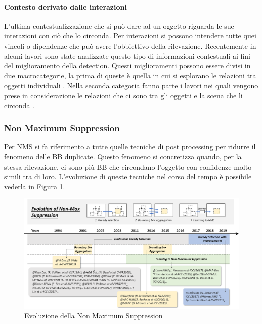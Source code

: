 \paragraph{Contesto derivato dalle interazioni}
L'ultima contestualizzazione che si può dare ad un oggetto riguarda le sue interazioni con ciò che lo circonda. Per interazioni si possono intendere tutte quei vincoli o dipendenze che può avere l'obbiettivo della rilevazione. Recentemente in alcuni lavori sono state analizzate questo tipo di informazioni contestuali ai fini del miglioramento della detection. Questi miglioramenti possono essere divisi in due macrocategorie, la prima di queste è quella in cui si esplorano le relazioni tra oggetti individuali \cite{felzenszwalb2009object, desai2011discriminative, song2011contextualizing, chen2017spatial, hu2018relation}. Nella seconda categoria fanno parte i lavori nei quali vengono prese in considerazione le relazioni che ci sono tra gli oggetti e la scena che li circonda \cite{gupta2015exploring, liu2018structure}.
\subsubsection{Non Maximum Suppression}
Per \ac{NMS} si fa riferimento a tutte quelle tecniche di post processing per ridurre il fenomeno delle \ac{BB} duplicate. Questo fenomeno si concretizza quando, per la stessa rilevazione, ci sono più \ac{BB} che circondano l'oggetto con confidenze molto simili tra di loro. L'evoluzione di queste tecniche nel corso del tempo è possibile vederla in Figura \ref{fig:NMS_history}. 
\begin{figure}
    \centering
    \includegraphics[width=\textwidth]{images/evol-nms.png}
    \caption{Evoluzione della Non Maximum Suppression \cite{DBLP:journals/corr/abs-1905-05055}}
    \label{fig:NMS_history}
\end{figure}


